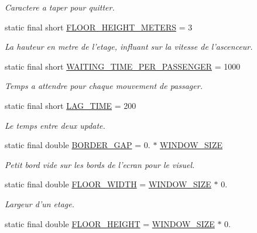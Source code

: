 \begin{DoxyCompactItemize}
\begin{DoxyCompactList}\small\item\em Caractere a taper pour quitter. \end{DoxyCompactList}\item 
static final short \hyperlink{classDefines_aae6f35fc0dc85e4189f0be67c6af6fb1}{F\-L\-O\-O\-R\-\_\-\-H\-E\-I\-G\-H\-T\-\_\-\-M\-E\-T\-E\-R\-S} = 3
\begin{DoxyCompactList}\small\item\em La hauteur en metre de l'etage, influant sur la vitesse de l'ascenceur. \end{DoxyCompactList}\item 
static final short \hyperlink{classDefines_aece514c1581f2329ad852547b512827c}{W\-A\-I\-T\-I\-N\-G\-\_\-\-T\-I\-M\-E\-\_\-\-P\-E\-R\-\_\-\-P\-A\-S\-S\-E\-N\-G\-E\-R} = 1000
\begin{DoxyCompactList}\small\item\em Temps a attendre pour chaque mouvement de passager. \end{DoxyCompactList}\item 
static final short \hyperlink{classDefines_a496860d61bb30a925275bfde3ddc3b20}{L\-A\-G\-\_\-\-T\-I\-M\-E} = 200
\begin{DoxyCompactList}\small\item\em Le temps entre deux update. \end{DoxyCompactList}\item 
static final double \hyperlink{classDefines_ae1cb2849525afcbee188dd5681a29f2f}{B\-O\-R\-D\-E\-R\-\_\-\-G\-A\-P} = 0. $\ast$ \hyperlink{classDefines_aafb660e1c1534aec4d2cee6cfe57029f}{W\-I\-N\-D\-O\-W\-\_\-\-S\-I\-Z\-E}
\begin{DoxyCompactList}\small\item\em Petit bord vide sur les bords de l'ecran pour le visuel. \end{DoxyCompactList}\item 
static final double \hyperlink{classDefines_ad5528ce6b91911a4ca4e9f364543ef9c}{F\-L\-O\-O\-R\-\_\-\-W\-I\-D\-T\-H} = \hyperlink{classDefines_aafb660e1c1534aec4d2cee6cfe57029f}{W\-I\-N\-D\-O\-W\-\_\-\-S\-I\-Z\-E} $\ast$ 0.
\begin{DoxyCompactList}\small\item\em Largeur d'un etage. \end{DoxyCompactList}\item 
static final double \hyperlink{classDefines_a2a43fe315bf385b8693c70fbf824a3d0}{F\-L\-O\-O\-R\-\_\-\-H\-E\-I\-G\-H\-T} = \hyperlink{classDefines_aafb660e1c1534aec4d2cee6cfe57029f}{W\-I\-N\-D\-O\-W\-\_\-\-S\-I\-Z\-E} $\ast$ 0.

\end{DoxyCompactItemize}
